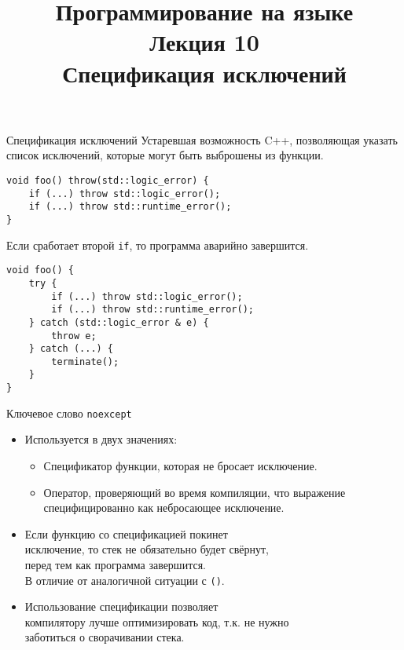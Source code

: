 \documentclass[aspectration=1610,t]{beamer}
\title{{\bf Программирование на языке \langcpp\protect\\Лекция
10\protect\vspace{1em}\\}Спецификация исключений}
\begin{document}
\begin{frame} 
  \titlepage
\end{frame}

\begin{frame}[fragile]{Спецификация исключений}
Устаревшая возможность C++,
позволяющая указать список исключений, которые могут быть выброшены из функции.
\begin{lstlisting}
void foo() throw(std::logic_error) {
    if (...) throw std::logic_error();
    if (...) throw std::runtime_error();
}               
\end{lstlisting}
Если сработает второй {\tt if}, то программа аварийно завершится.
\begin{lstlisting}
void foo() {
    try {
        if (...) throw std::logic_error();
        if (...) throw std::runtime_error();
    } catch (std::logic_error & e) { 
        throw e;
    } catch (...) { 
        terminate();
    }
}
\end{lstlisting}
\end{frame}


\begin{frame}[fragile]{Ключевое слово \texttt{noexcept}}
\begin{itemize}
    \item Используется в двух значениях:
    \begin{itemize}
        \item Спецификатор функции, которая не бросает исключение.
        \item Оператор, проверяющий во время компиляции, что выражение
            специфицированно как небросающее исключение.
    \end{itemize}

\item Если функцию со спецификацией  покинет\\ 
    исключение, то стек не обязательно будет свёрнут, \\перед тем как программа завершится.\\  
    В отличие от аналогичной ситуации с \texttt{()}.

\item Использование спецификации  позволяет\\
    компилятору лучше оптимизировать код, т.к. 
    не нужно\\ заботиться о сворачивании стека.
\end{itemize}

\end{frame}
\end{document}
